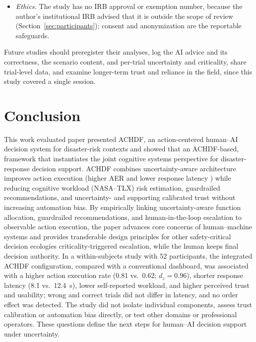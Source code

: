 \documentclass[journal]{IEEEtran}
\theoremstyle{plain}
\theoremstyle{definition}
\providecommand{\DIFaddtex}[1]{{\protect\color{blue} \sf #1}} %
\providecommand{\DIFdeltex}[1]{{\protect\color{red} \scriptsize #1}} %
\providecommand{\DIFaddbegin}{} %
\providecommand{\DIFaddend}{} %
\providecommand{\DIFdelbegin}{} %
\providecommand{\DIFdelend}{} %
\providecommand{\DIFadd}[1]{\texorpdfstring{\DIFaddtex{#1}}{#1}} %
\providecommand{\DIFdel}[1]{\texorpdfstring{\DIFdeltex{#1}}{}} %
\newcommand{\DIFscaledelfig}{0.5}
\newlength{\DIFdelgraphicswidth} %
\newlength{\DIFdelgraphicsheight} %
\newcommand{\DIFaddincludegraphics}[2][]{{\color{blue}\fbox{\DIFOincludegraphics[#1]{#2}}}} %
\newcommand{\DIFdelincludegraphics}[2][]{%
\sbox{\DIFdelgraphicsbox}{\DIFOincludegraphics[#1]{#2}}%
\settoboxwidth{\DIFdelgraphicswidth}{\DIFdelgraphicsbox} %
\settoboxtotalheight{\DIFdelgraphicsheight}{\DIFdelgraphicsbox} %
\scalebox{\DIFscaledelfig}{%
\parbox[b]{\DIFdelgraphicswidth}{\usebox{\DIFdelgraphicsbox}\\[-\baselineskip] \rule{\DIFdelgraphicswidth}{0em}}\llap{\resizebox{\DIFdelgraphicswidth}{\DIFdelgraphicsheight}{%
\setlength{\unitlength}{\DIFdelgraphicswidth}%
\begin{picture}(1,1)%
\thicklines\linethickness{2pt} %
{\color[rgb]{1,0,0}\put(0,0){\framebox(1,1){}}}%
{\color[rgb]{1,0,0}\put(0,0){\line( 1,1){1}}}%
{\color[rgb]{1,0,0}\put(0,1){\line(1,-1){1}}}%
\end{picture}%
}\hspace*{3pt}}} %
} %
\DeclareRobustCommand{\DIFaddbegin}{\DIFOaddbegin \let\includegraphics\DIFaddincludegraphics} %
\DeclareRobustCommand{\DIFaddend}{\DIFOaddend \let\includegraphics\DIFOincludegraphics} %
\DeclareRobustCommand{\DIFdelbegin}{\DIFOdelbegin \let\includegraphics\DIFdelincludegraphics} %
\DeclareRobustCommand{\DIFdelend}{\DIFOaddend \let\includegraphics\DIFOincludegraphics} %
\begin{document}
\begin{itemize}
{        }\item \DIFadd{\emph{Ethics.} The study has no IRB approval or exemption number, because the author's institutional IRB advised that it is outside the scope of review (Section~\ref{sec:participants}); consent and anonymization are the reportable safeguards.
    }\end{itemize}
    \DIFadd{Future studies should preregister their analyses, log the AI advice and its correctness, the scenario content, and per-trial uncertainty and criticality, share trial-level data, and examine longer-term trust and reliance in the field, since this study covered a single session}\DIFaddend .

\section{Conclusion}
This \DIFdelbegin \DIFdel{work evaluated }\DIFdelend \DIFaddbegin \DIFadd{paper presented ACHDF, }\DIFaddend an action-centered human--AI decision \DIFdelbegin \DIFdel{system for disaster-risk contexts and showed that an ACHDF-based, }\DIFdelend \DIFaddbegin \DIFadd{framework that instantiates the joint cognitive systems perspective for disaster-response decision support. ACHDF combines }\DIFaddend uncertainty-aware \DIFdelbegin \DIFdel{architecture improves action execution (higher AER and lower response latency ) while reducing cognitive workload (NASA--TLX)}\DIFdelend \DIFaddbegin \DIFadd{risk estimation, guardrailed recommendations, and uncertainty- }\DIFaddend and \DIFdelbegin \DIFdel{supporting calibrated trust without increasing automation bias. By empirically linking uncertainty-aware function allocation, guardrailed recommendations, and human-in-the-loop escalation to observable action execution, the paper advances core concerns of human--machine systems and provides transferable design principles for other safety-critical decision ecologies}\DIFdelend \DIFaddbegin \DIFadd{criticality-triggered escalation, while the human keeps final decision authority. In a within-subjects study with 52 participants, the integrated ACHDF configuration, compared with a conventional dashboard, was associated with a higher action execution rate (0.81 vs.\ 0.62; $d_z=0.96$), shorter response latency (8.1 vs.\ 12.4~s), lower self-reported workload, and higher perceived trust and usability; wrong and correct trials did not differ in latency, and no order effect was detected. The study did not isolate individual components, assess trust calibration or automation bias directly, or test other domains or professional operators. These questions define the next steps for human--AI decision support under uncertainty}\DIFaddend .
\end{document}
